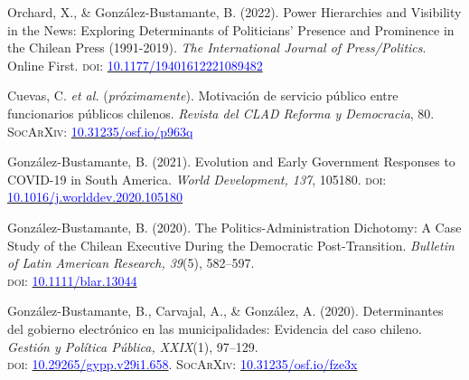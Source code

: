 \begin{publications}

\begin{benumerate}{7}

\item{Orchard, X., \& González-Bustamante, B. (2022). Power Hierarchies and Visibility in the News: Exploring Determinants of Politicians’ Presence and Prominence in the Chilean Press (1991-2019). {\itshape The International Journal of Press/Politics}. Online First. {\scshape doi:} \href{https://doi.org/10.1177/19401612221089482}{\textcolor{blue}{10.1177/19401612221089482}}}

\item{\small Cuevas, C. {\itshape et al.} ({\itshape próximamente}). Motivación de servicio público entre funcionarios públicos chilenos. {\itshape Revista del CLAD Reforma y Democracia}, 80. {\scshape \footnotesize SocArXiv}: \href{https://doi.org/10.31235/osf.io/p963q}{\textcolor{blue}{10.31235/osf.io/p963q}}}\vspace{1mm}

\item{\small Gonz\'alez-Bustamante, B. (2021). Evolution and Early Government Responses to COVID-19 in South America. {\itshape World Development, 137}, 105180. {\scshape doi:} \href{https://doi.org/10.1016/j.worlddev.2020.105180}{\textcolor{blue}{10.1016/j.worlddev.2020.105180}}}\vspace{1mm}

\item{\small Gonz\'alez-Bustamante, B. (2020). The Politics-Administration Dichotomy: A Case Study of the Chilean Executive During the Democratic Post-Transition. {\itshape Bulletin of Latin American Research, 39}(5), 582--597. \\ {\scshape doi}: \href{https://doi.org/10.1111/blar.13044}{\textcolor{blue}{10.1111/blar.13044}}}\vspace{1mm}

\item{\small Gonz\'alez-Bustamante, B., Carvajal, A., \& Gonz\'alez, A. (2020). Determinantes del gobierno electrónico en las municipalidades: Evidencia del caso chileno. {\itshape Gesti\'on y Pol\'itica P\'ublica, XXIX}(1), 97--129. \\ {\scshape doi:} \href{http://dx.doi.org/10.29265/gypp.v29i1.658}{\textcolor{blue}{10.29265/gypp.v29i1.658}}. {\scshape \footnotesize SocArXiv}: \href{https://doi.org/10.31235/osf.io/fze3x}{\textcolor{blue}{10.31235/osf.io/fze3x}}} \vspace{1mm}


\end{benumerate}
\end{publications}
